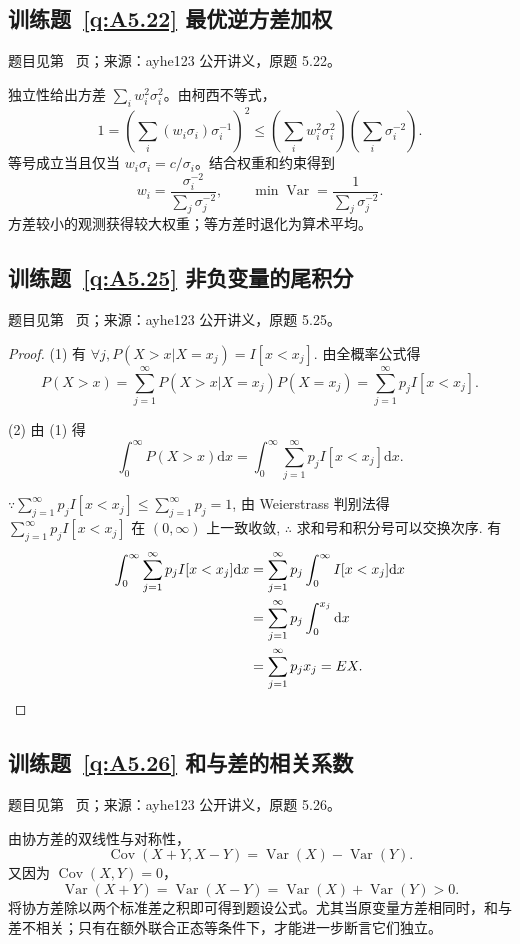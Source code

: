 \documentclass[UTF8,12pt,a4paper,fontset=fandol]{ctexbook}
\begin{document}
\subsection*{训练题~\ref{q:A5.22} 最优逆方差加权}\label{a:A5.22}{\small 题目见第~\pageref{q:A5.22} 页；来源：ayhe123 公开讲义，原题 5.22。}
\begin{solve}独立性给出方差 $\sum_iw_i^2\sigma_i^2$。由柯西不等式，\[1=\left(\sum_i(w_i\sigma_i)\sigma_i^{-1}\right)^2\le\left(\sum_iw_i^2\sigma_i^2\right)\left(\sum_i\sigma_i^{-2}\right).\]等号成立当且仅当 $w_i\sigma_i=c/\sigma_i$。结合权重和约束得到\[w_i=\frac{\sigma_i^{-2}}{\sum_j\sigma_j^{-2}},\qquad\min\operatorname{Var}=\frac{1}{\sum_j\sigma_j^{-2}}.\]方差较小的观测获得较大权重；等方差时退化为算术平均。\end{solve}

\subsection*{训练题~\ref{q:A5.25} 非负变量的尾积分}\label{a:A5.25}{\small 题目见第~\pageref{q:A5.25} 页；来源：ayhe123 公开讲义，原题 5.25。}
\begin{proof}
    (1) 有 $\forall j,P(X>x|X=x_j)=I[x<x_j]$. 由全概率公式得
    \[P(X>x)=\sum\limits_{j=1}^\infty P(X>x|X=x_j)P(X=x_j)=\sum\limits_{j=1}^\infty p_jI[x<x_j].\]

    (2) 由 (1) 得
    \[\int_0^\infty P(X>x)\mathrm{d}x=\int_0^\infty\sum\limits_{j=1}^\infty p_jI[x<x_j]\mathrm{d}x.\]

    $\because\sum\limits_{j=1}^\infty p_jI[x<x_j]\leq\sum\limits_{j=1}^\infty p_j=1$, 由 Weierstrass 判别法得 $\sum\limits_{j=1}^\infty p_jI[x<x_j]$ 在 $(0,\infty)$ 上一致收敛, $\therefore$ 求和号和积分号可以交换次序. 有
    \begin{align*}
        \int_0^\infty\sum\limits_{j=1}^\infty p_jI[x<x_j]\mathrm{d}x & =\sum\limits_{j=1}^\infty p_j\int_0^\infty I[x<x_j]\mathrm{d}x \\
        & =\sum\limits_{j=1}^\infty p_j\int_0^{x_j}\mathrm{d}x \\
        & =\sum\limits_{j=1}^\infty p_jx_j=EX.\qedhere
    \end{align*}
\end{proof}

\subsection*{训练题~\ref{q:A5.26} 和与差的相关系数}\label{a:A5.26}{\small 题目见第~\pageref{q:A5.26} 页；来源：ayhe123 公开讲义，原题 5.26。}
\begin{solve}由协方差的双线性与对称性，\[\operatorname{Cov}(X+Y,X-Y)=\operatorname{Var}(X)-\operatorname{Var}(Y).\]又因为 $\operatorname{Cov}(X,Y)=0$，\[\operatorname{Var}(X+Y)=\operatorname{Var}(X-Y)=\operatorname{Var}(X)+\operatorname{Var}(Y)>0.\]将协方差除以两个标准差之积即可得到题设公式。尤其当原变量方差相同时，和与差不相关；只有在额外联合正态等条件下，才能进一步断言它们独立。\end{solve}
\end{document}
